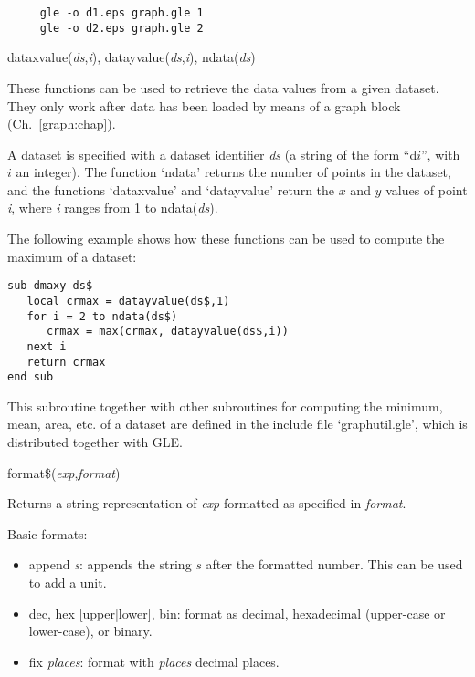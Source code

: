 \begin{commanddescription}
\begin{Verbatim}
     gle -o d1.eps graph.gle 1
     gle -o d2.eps graph.gle 2
\end{Verbatim}

\item[{\sf dataxvalue({\it ds},{\it i}), datayvalue({\it ds},{\it i}), ndata({\it ds})}]
\label{dataxvalue}
\label{datayvalue}
\label{ndata}

These functions can be used to retrieve the data values from a given dataset. They only work after data has been loaded by means of a graph block (Ch.~\ref{graph:chap}).

A dataset is specified with a dataset identifier {\it ds} (a string of the form ``d$i$'', with $i$ an integer). The function `{\sf ndata}' returns the number of points in the dataset, and the functions `{\sf dataxvalue}' and `{\sf datayvalue}' return the $x$ and $y$ values of point {\it i}, where {\it i} ranges from 1 to {\sf ndata({\it ds})}.

The following example shows how these functions can be used to compute the maximum of a dataset:

\begin{Verbatim}
sub dmaxy ds$
   local crmax = datayvalue(ds$,1)
   for i = 2 to ndata(ds$)
      crmax = max(crmax, datayvalue(ds$,i))
   next i
   return crmax
end sub
\end{Verbatim}

This subroutine together with other subroutines for computing the minimum, mean, area, etc. of a dataset are defined in the include file `graphutil.gle', which is distributed together with GLE.

\item[{\sf format\$({\it exp},{\it format})}]
 \label{formatnum:pg}

Returns a string representation of {\it exp} formatted as specified in {\it format}.

Basic formats:
\begin{itemize}
\item {\sf append {\it s}}: appends the string $s$ after the formatted number. This can be used to add a unit.

\item {\sf dec}, {\sf hex [upper|lower]}, {\sf bin}: format as decimal, hexadecimal (upper-case or lower-case), or binary.

\item {\sf fix} {\it places}: format with {\it places} decimal places.


\end{itemize}
\end{commanddescription}
